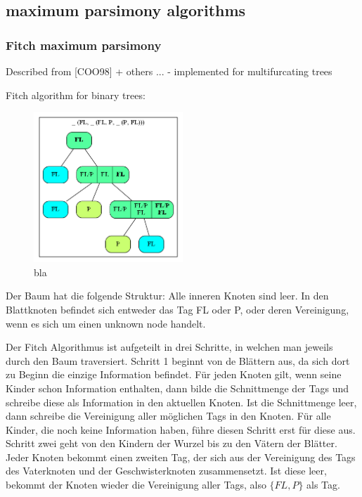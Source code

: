     \subsection{maximum parsimony algorithms}
      \subsubsection{Fitch maximum parsimony}
        Described from [COO98] + others ... - implemented for multifurcating trees

        Fitch algorithm for binary trees:
        \begin{figure}
          \caption{bla}
          \centering
            \includegraphics[width=0.5\textwidth]{Figures/Fitch1.png}
        \end{figure}

        Der Baum hat die folgende Struktur: Alle inneren Knoten sind leer. In den Blattknoten befindet 
        sich entweder das Tag FL oder P, oder deren Vereinigung, wenn es sich um einen unknown node handelt.

        Der Fitch Algorithmus ist aufgeteilt in drei Schritte, in welchen man jeweils durch den Baum traversiert.
        Schritt 1 beginnt von de Blättern aus, da sich dort zu Beginn die einzige Information befindet. 
        Für jeden Knoten gilt, wenn seine Kinder schon Information enthalten, dann bilde die Schnittmenge 
        der Tags und schreibe diese als Information in den aktuellen Knoten. Ist die Schnittmenge leer, 
        dann schreibe die Vereinigung aller möglichen Tags in den Knoten. Für alle Kinder, die noch keine 
        Information haben, führe diesen Schritt erst für diese aus.
        Schritt zwei geht von den Kindern der Wurzel bis zu den Vätern der Blätter. Jeder Knoten bekommt 
        einen zweiten Tag, der sich aus der Vereinigung des Tags des Vaterknoten und der Geschwisterknoten
        zusammensetzt. Ist diese leer, bekommt der Knoten wieder die Vereinigung aller Tags, also $\{FL,P\}$ als Tag.

